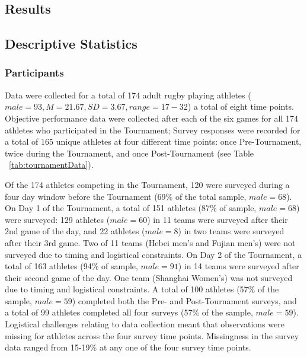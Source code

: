 \begin{CJK}{UTF8}{gbsn}
\clearpage

\section{Results}



\subsection{Descriptive Statistics}

  \subsubsection{Participants}

Data were collected for a total of 174 adult rugby playing athletes ($male = 93, M = 21.67, SD = 3.67, range = 17-32$) a total of eight time points. Objective performance data were collected after each of the six games for all 174 athletes who participated in the Tournament;  Survey responses were recorded for a total of 165 unique athletes at four different time points: once Pre-Tournament, twice during the Tournament, and once Post-Tournament (see Table ~\ref{tab:tournamentData}).



Of the 174 athletes competing in the Tournament, 120 were surveyed during a four day window before the Tournament (69\% of the total sample, $male = 68$).  On Day 1 of the Tournament, a total of 151 athletes (87\% of sample, $male = 68$) were surveyed: 129 athletes ($male = 60$) in 11 teams were surveyed after their 2nd game of the day, and 22 athletes ($male = 8$) in two teams were surveyed after their 3rd game. Two of 11 teams (Hebei men’s and Fujian men’s) were not surveyed due to timing and logistical constraints.  On Day 2 of the Tournament, a total of 163 athletes (94\% of sample, $male = 91$) in 14 teams were surveyed after their second game of the day. One team (Shanghai Women’s) was not surveyed due to timing and logistical constraints.  A total of 100 athletes (57\% of the sample, $male = 59$) completed both the Pre- and Post-Tournament surveys, and a total of 99 athletes completed all four surveys (57\% of the sample, $male = 59$). Logistical challenges relating to data collection meant that observations were missing for athletes across the four survey time points. Missingness in the survey data ranged from 15-19\% at any one of the four survey time points.\\



\end{CJK}
